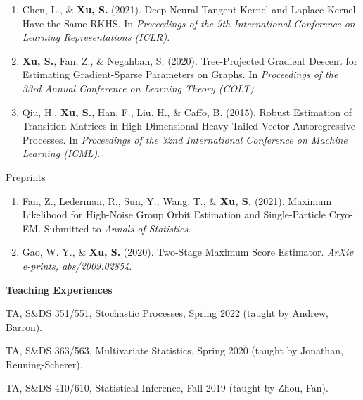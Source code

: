 \documentclass{article}
\begin{document}
\begin{enumerate}
\item Chen, L., \& \textbf{Xu, S.} (2021). Deep Neural Tangent Kernel and Laplace Kernel Have the Same RKHS. In \emph{Proceedings of the 9th International Conference on Learning Representations (ICLR)}.
\item \textbf{Xu, S.}, Fan, Z., \& Negahban, S. (2020). Tree-Projected Gradient Descent for Estimating Gradient-Sparse Parameters on Graphs.  In \emph{Proceedings of the 33rd Annual Conference on Learning Theory (COLT)}.
\item Qiu, H., \textbf{Xu, S.}, Han, F., Liu, H., \& Caffo, B. (2015). Robust Estimation of Transition Matrices in High Dimensional Heavy-Tailed Vector Autoregressive Processes. In \emph{Proceedings of the 32nd International
Conference on Machine Learning (ICML)}.
\end{enumerate}



\begin{large}
\noindent Preprints
\end{large}

\begin{enumerate}

\item Fan, Z., Lederman, R., Sun, Y., Wang, T., \& \textbf{Xu, S.} (2021). Maximum Likelihood for High-Noise Group Orbit Estimation and Single-Particle Cryo-EM. Submitted to \emph{Annals of Statistics}.



\item Gao, W. Y., \& \textbf{Xu, S.} (2020). Two-Stage Maximum Score Estimator. \emph{ArXiv e-prints, abs/2009.02854}.
\end{enumerate}





\vspace{5mm}
\begin{large}
\noindent \textbf{Teaching Experiences}
\end{large}
\vspace{5mm}

TA, S\&{DS} 351/551, Stochastic Processes, Spring 2022 (taught by Andrew, Barron). 

\vspace{2mm}
TA, S\&{DS} 363/563, Multivariate Statistics, Spring 2020 (taught by Jonathan, Reuning-Scherer). 

\vspace{2mm}
TA, S\&{DS} 410/610, Statistical Inference, Fall 2019 (taught by Zhou, Fan). 
\end{document}
